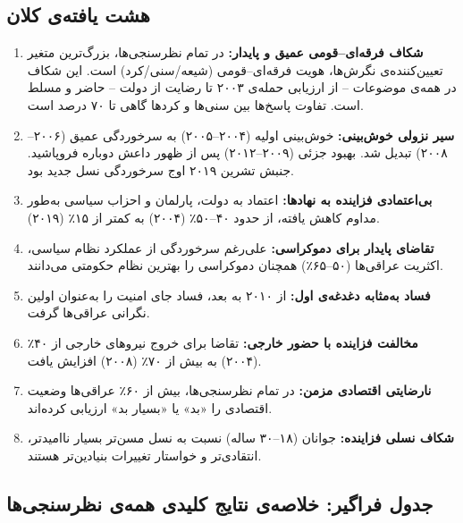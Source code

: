\subsection{هشت یافته‌ی کلان}

\begin{enumerate}[rightmargin=1cm, itemsep=8pt]

\item \textbf{شکاف فرقه‌ای--قومی عمیق و پایدار:}
در تمام نظرسنجی‌ها، بزرگ‌ترین متغیر تعیین‌کننده‌ی نگرش‌ها، هویت 
فرقه‌ای--قومی (شیعه/سنی/کرد) است. این شکاف در همه‌ی موضوعات -- از 
ارزیابی حمله‌ی ۲۰۰۳ تا رضایت از دولت -- حاضر و مسلط است. 
تفاوت پاسخ‌ها بین سنی‌ها و کردها گاهی تا ۷۰ درصد است.

\item \textbf{سیر نزولی خوش‌بینی:}
خوش‌بینی اولیه (۲۰۰۴--۲۰۰۵) به سرخوردگی عمیق (۲۰۰۶--۲۰۰۸) تبدیل شد. 
بهبود جزئی (۲۰۰۹--۲۰۱۲) پس از ظهور داعش دوباره فروپاشید. 
جنبش تشرین ۲۰۱۹ اوج سرخوردگی نسل جدید بود.

\item \textbf{بی‌اعتمادی فزاینده به نهادها:}
اعتماد به دولت، پارلمان و احزاب سیاسی به‌طور مداوم کاهش یافته، 
از حدود ۴۰--۵۰٪ (۲۰۰۴) به کمتر از ۱۵٪ (۲۰۱۹).

\item \textbf{تقاضای پایدار برای دموکراسی:}
علی‌رغم سرخوردگی از عملکرد نظام سیاسی، اکثریت عراقی‌ها (۵۰--۶۵٪) 
همچنان دموکراسی را بهترین نظام حکومتی می‌دانند.

\item \textbf{فساد به‌مثابه دغدغه‌ی اول:}
از ۲۰۱۰ به بعد، فساد جای امنیت را به‌عنوان اولین نگرانی عراقی‌ها گرفت.

\item \textbf{مخالفت فزاینده با حضور خارجی:}
تقاضا برای خروج نیروهای خارجی از ۴۰٪ (۲۰۰۴) به بیش از ۷۰٪ (۲۰۰۸) افزایش یافت.

\item \textbf{نارضایتی اقتصادی مزمن:}
در تمام نظرسنجی‌ها، بیش از ۶۰٪ عراقی‌ها وضعیت اقتصادی را «بد» یا «بسیار بد» ارزیابی کرده‌اند.

\item \textbf{شکاف نسلی فزاینده:}
جوانان (۱۸--۳۰ ساله) نسبت به نسل مسن‌تر بسیار ناامیدتر، انتقادی‌تر و 
خواستار تغییرات بنیادین‌تر هستند.

\end{enumerate}

\subsection{جدول فراگیر: خلاصه‌ی نتایج کلیدی همه‌ی نظرسنجی‌ها}

